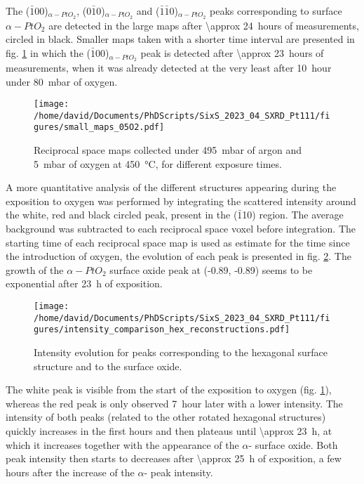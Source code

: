 The ($\bar{1}0$0)$_{\alpha-PtO_2}$, ($0\bar{1}$0)$_{\alpha-PtO_2}$ and ($\bar{1}\bar{1}$0)$_{\alpha-PtO_2}$ peaks corresponding to surface ${\alpha-PtO_2}$ are detected in the large maps after \qty{\approx 24}{hours} of measurements, circled in black.
Smaller maps taken with a shorter time interval are presented in fig. \ref{fig:SmallMapsPt111LowOxygen} in which the ($\bar{1}0$0)$_{\alpha-PtO_2}$ peak is detected after \qty{\approx 23}{hours} of measurements, when it was already detected at the very least after \qty{10}{hour} under \qty{80}{\milli\bar} of oxygen.

\begin{figure}[!htb]
    \centering
    \texttt{[image: /home/david/Documents/PhDScripts/SixS\_2023\_04\_SXRD\_Pt111/figures/small\_maps\_05O2.pdf]}
    \caption{
        Reciprocal space maps collected under \qty{495}{\milli\bar} of argon and \qty{5}{\milli\bar} of oxygen at \qty{450}{\degreeCelsius}, for different exposure times.
    }
    \label{fig:SmallMapsPt111LowOxygen}
\end{figure}

A more quantitative analysis of the different structures appearing during the exposition to oxygen was performed by integrating the scattered intensity around the white, red and black circled peak, present in the ($\bar{1}$10) region.
The average background was subtracted to each reciprocal space voxel before integration.
The starting time of each reciprocal space map is used as estimate for the time since the introduction of oxygen, the evolution of each peak is presented in fig. \ref{fig:HexBraggPeaks}.
The growth of the ${\alpha-PtO_2}$ surface oxide peak at (-0.89, -0.89) seems to be exponential after \qty{23}{\hour} of exposition.

\begin{figure}[!htb]
    \centering
    \texttt{[image: /home/david/Documents/PhDScripts/SixS\_2023\_04\_SXRD\_Pt111/figures/intensity\_comparison\_hex\_reconstructions.pdf]}
    \caption{
        Intensity evolution for peaks corresponding to the hexagonal surface structure and to the surface oxide.
    }
    \label{fig:HexBraggPeaks}
\end{figure}

The white peak is visible from the start of the exposition to oxygen (fig. \ref{fig:SmallMapsPt111LowOxygen}), whereas the red peak is only observed \qty{7}{hour} later with a lower intensity.
The intensity of both peaks (related to the other rotated hexagonal structures) quickly increases in the first hours and then plateaus until \qty{\approx 23}{\hour}, at which it increases together with the appearance of the $\alpha$- surface oxide.
Both peak intensity then starts to decreases after \qty{\approx 25}{\hour} of exposition, a few hours after the increase of the $\alpha$- peak intensity.

